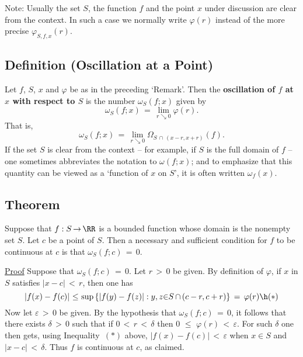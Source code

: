         Note: Usually the set $S$, the function $f$ and the point $x$ under discussion are clear from the context.
    In such a case we normally write ${\varphi}(r)$ instead of the more precise ${\varphi}_{S,f,x}(r)$.

\V

             \subsection{\small{\bf Definition} (Oscillation at a Point)}
            \label{DefF40.30}

        Let $f$, $S$, $x$ and ${\varphi}$ be as in the preceding `Remark'.
    Then the {\bf oscillation of $f$ at $x$ with respect to $S$} is the number ${\omega}_{S}(f;x)$ given by
        \begin{displaymath}
        {\omega}_{S}(f;x) \,=\, \lim_{r{\searrow}0} {\varphi}(r).
        \end{displaymath}
    That is,
        \begin{equation}
        \label{EqnF.70}
        {\omega}_{S}(f;x) \,=\, \lim_{r{\searrow}0} {\Omega}_{S\,{\cap}\,(x-r,x+r)}(f).
        \end{equation}
    If the set $S$ is clear from the context -- for example, if $S$ is the full domain of $f$ --
    one sometimes abbreviates the notation to ${\omega}(f;x)$;
    and to emphasize that this quantity can be viewed as a `function of $x$ on $S$', it is often written ${\omega}_{f}(x)$.

\V

             \subsection{\small{\bf Theorem}}
            \label{ThmF40.40}

        Suppose that $f:S \,{\rightarrow}\, {\RR}$ is a bounded function whose domain is the nonempty set $S$.
    Let $c$ be a point of $S$.
    Then a necessary and sufficient condition for $f$ to be continuous at $c$ is that ${\omega}_{S}(f;c) \,=\, 0$.

\V

        \underline{Proof} Suppose that ${\omega}_{S}(f;c) \,=\, 0$.
    Let $r\,>\,0$ be given.
    By definition of ${\varphi}$, if $x$ in $S$ satisfies $|x-c|\,<\,r$, then one has
        \begin{displaymath}
        |f(x)-f(c)|\,\,{\leq}\,\,{\sup}\,\{|f(y)-f(z)|: y,z{\in}S\,{\cap}\,(c-r,c+r)\} \,=\, {\varphi}(r) \h ({\ast})
        \end{displaymath}
    Now let ${\varepsilon}\,>\,0$  be given. By the hypothesis that ${\omega}_{S}(f;c) \,=\, 0$,
    it follows that there exists ${\delta}\,>\,0$ such that if $0\,<\,r\,<\,{\delta}$ then $0\,\,{\leq}\,\,{\varphi}(r)\,<\,{\varepsilon}$.
    For such ${\delta}$ one then gets, using Inequality~$({\ast})$ above, $|f(x)-f(c)|\,<\,{\varepsilon}$ when $x{\in}S$ and $|x-c|\,<\,{\delta}$.
    Thus $f$ is continuous at $c$, as claimed.

